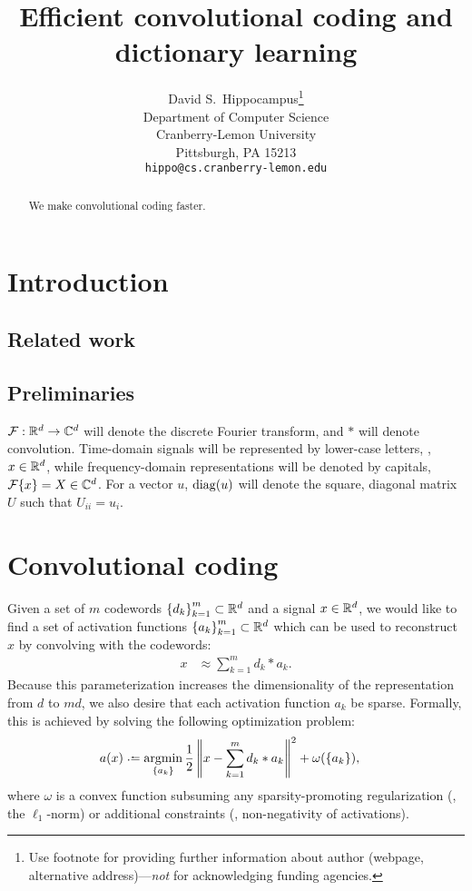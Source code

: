 \documentclass{article} %
\title{Efficient convolutional coding and dictionary learning}
\author{
David S.~Hippocampus\thanks{ Use footnote for providing further information
about author (webpage, alternative address)---\emph{not} for acknowledging
funding agencies.} \\
Department of Computer Science\\
Cranberry-Lemon University\\
Pittsburgh, PA 15213 \\
\texttt{hippo@cs.cranberry-lemon.edu}
}
\begin{document}
\maketitle

\begin{abstract}
We make convolutional coding faster.
\end{abstract}

\section{Introduction}
\cite{mairal2010}


\subsection{Related work}

\subsection{Preliminaries}
$\mathcal{F}:\mathbb{R}^d\rightarrow\mathbb{C}^d$ will denote the discrete Fourier transform, and $*$ will denote
convolution.
Time-domain signals will be represented by lower-case letters, \eg, $x \in \mathbb{R}^d$, while
frequency-domain representations will be denoted by capitals, $\mathcal{F}\{x\} = X \in \mathbb{C}^d$.
For a vector $u$, $\operatorname{diag}(u)$ will denote the square, diagonal matrix $U$ such that 
$U_{ii} = u_i$.

\section{Convolutional coding}
\label{sec:convcode}
Given a set of $m$ codewords ${\{d_k\}}_{k=1}^m \subset \mathbb{R}^d$ and a signal $x\in\mathbb{R}^d$, 
we would like to find a set of activation functions ${\{a_k\}}_{k=1}^m\subset\mathbb{R}^d$ which
can be used to reconstruct $x$ by convolving with the codewords:
\begin{align}
x &\approx \sum_{k=1}^m d_k * a_k.\label{eq:convapprox}
\end{align}
Because this parameterization increases the dimensionality of the representation from $d$ 
to $md$, we also desire that each activation function $a_k$ be sparse.  Formally, this is 
achieved by solving the following optimization problem:
\begin{align}
a(x) &\defeq \argmin_{\{a_k\}} \frac{1}{2} \left\|x - \sum_{k=1}^m d_k * a_k\right\|^2 +
\omega(\{a_k\}), \label{eq:sisc}
\end{align}
where $\omega$ is a convex function subsuming any sparsity-promoting regularization 
(\eg, the $\ell_1$-norm) or additional constraints (\eg, non-negativity of activations).
\end{document}
